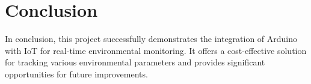 \documentclass[12pt]{report}
\begin{document}
	\clearpage
	\section*{Conclusion}
	In conclusion, this project successfully demonstrates the integration of Arduino with IoT for real-time environmental monitoring. It offers a cost-effective solution for tracking various environmental parameters and provides significant opportunities for future improvements.
	
	
	
	
\end{document}
